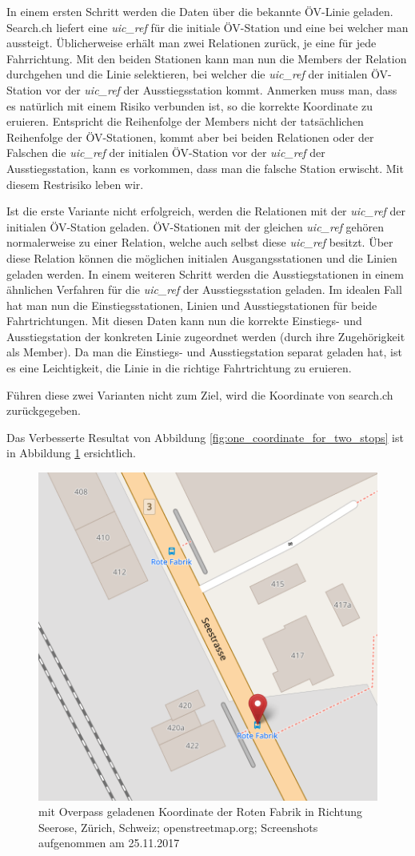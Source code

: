 In einem ersten Schritt werden die Daten über die bekannte ÖV-Linie geladen. Search.ch \cite{search_ch_route_api} liefert eine \emph{uic\_ref} für die initiale ÖV-Station und eine bei welcher man aussteigt. Üblicherweise erhält man zwei Relationen zurück, je eine für jede Fahrrichtung. Mit den beiden Stationen kann man nun die Members der Relation durchgehen und die Linie selektieren, bei welcher die \emph{uic\_ref} der initialen ÖV-Station vor der \emph{uic\_ref} der Ausstiegsstation kommt.
Anmerken muss man, dass es natürlich mit einem Risiko verbunden ist, so die korrekte Koordinate zu eruieren. Entspricht die Reihenfolge der Members nicht der tatsächlichen Reihenfolge der ÖV-Stationen, kommt aber bei beiden Relationen oder der Falschen die \emph{uic\_ref} der initialen ÖV-Station vor der \emph{uic\_ref} der Ausstiegsstation, kann es vorkommen, dass man die falsche Station erwischt. Mit diesem Restrisiko leben wir.

Ist die erste Variante nicht erfolgreich, werden die Relationen mit der \emph{uic\_ref} der initialen ÖV-Station geladen. ÖV-Stationen mit der gleichen \emph{uic\_ref} gehören normalerweise zu einer Relation, welche auch selbst diese \emph{uic\_ref} besitzt. Über diese Relation können die möglichen initialen Ausgangsstationen und die Linien geladen werden. In einem weiteren Schritt werden die Ausstiegstationen in einem ähnlichen Verfahren für die \emph{uic\_ref} der Ausstiegsstation geladen. Im idealen Fall hat man nun die Einstiegsstationen, Linien und Ausstiegstationen für beide Fahrtrichtungen. Mit diesen Daten kann nun die korrekte Einstiegs- und Ausstiegstation der konkreten Linie zugeordnet werden (durch ihre Zugehörigkeit als Member). Da man die Einstiegs- und Ausstiegstation separat geladen hat, ist es eine Leichtigkeit, die Linie in die richtige Fahrtrichtung zu eruieren.

Führen diese zwei Varianten nicht zum Ziel, wird die Koordinate von search.ch zurückgegeben.

Das Verbesserte Resultat von Abbildung \ref{fig:one_coordinate_for_two_stops} ist in Abbildung \ref{fig:one_coordinate_for_two_stops_improved} ersichtlich.

\begin{figure}[ht]
    \centering
    \includegraphics[width=0.5\linewidth]{projectdoc/img/one_coordinate_for_two_stops_improved}
    \caption[mit Overpass geladenen Koordinate]{mit Overpass geladenen Koordinate der Roten Fabrik in Richtung Seerose, Zürich, Schweiz; openstreetmap.org; Screenshots aufgenommen am 25.11.2017}
    \label{fig:one_coordinate_for_two_stops_improved}
\end{figure}


